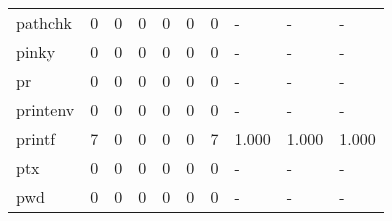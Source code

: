 \begin{longtable}{lp{1.3cm}p{1.3cm}p{1.3cm}p{1.3cm}p{1.3cm}p{1.3cm}p{1.3cm}p{1.3cm}p{1.3cm}}
pathchk   &                      0 &                                             0 &                                            0 &                                           0 &                                            0 &                                          0 &                                    - &                                      - &                                    - \\
pinky     &                      0 &                                             0 &                                            0 &                                           0 &                                            0 &                                          0 &                                    - &                                      - &                                    - \\
pr        &                      0 &                                             0 &                                            0 &                                           0 &                                            0 &                                          0 &                                    - &                                      - &                                    - \\
printenv  &                      0 &                                             0 &                                            0 &                                           0 &                                            0 &                                          0 &                                    - &                                      - &                                    - \\
printf    &                      7 &                                             0 &                                            0 &                                           0 &                                            0 &                                          7 &                                1.000 &                                  1.000 &                                1.000 \\
ptx       &                      0 &                                             0 &                                            0 &                                           0 &                                            0 &                                          0 &                                    - &                                      - &                                    - \\
pwd       &                      0 &                                             0 &                                            0 &                                           0 &                                            0 &                                          0 &                                    - &                                      - &                                    - \\

\end{longtable}
